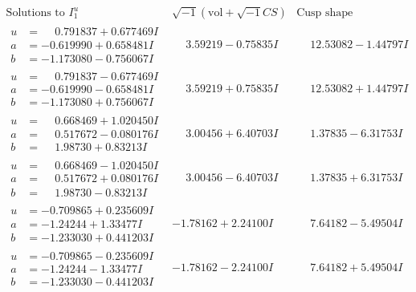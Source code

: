 \documentclass[1p]{elsarticle_modified}
\theoremstyle{definition}
\newcommand{\I}{\sqrt{-1}}
\begin{document}
$$\begin{array}{c|c|c}  
\text{Solutions to }I^u_{1}& \I (\text{vol} + \sqrt{-1}CS) & \text{Cusp shape}\\
 \hline 
\begin{aligned}
u &= \phantom{-}0.791837 + 0.677469 I \\
a &= -0.619990 + 0.658481 I \\
b &= -1.173080 - 0.756067 I\end{aligned}
 & \phantom{-}3.59219 - 0.75835 I & \phantom{-}12.53082 - 1.44797 I \\ \hline\begin{aligned}
u &= \phantom{-}0.791837 - 0.677469 I \\
a &= -0.619990 - 0.658481 I \\
b &= -1.173080 + 0.756067 I\end{aligned}
 & \phantom{-}3.59219 + 0.75835 I & \phantom{-}12.53082 + 1.44797 I \\ \hline\begin{aligned}
u &= \phantom{-}0.668469 + 1.020450 I \\
a &= \phantom{-}0.517672 - 0.080176 I \\
b &= \phantom{-}1.98730 + 0.83213 I\end{aligned}
 & \phantom{-}3.00456 + 6.40703 I & \phantom{-}1.37835 - 6.31753 I \\ \hline\begin{aligned}
u &= \phantom{-}0.668469 - 1.020450 I \\
a &= \phantom{-}0.517672 + 0.080176 I \\
b &= \phantom{-}1.98730 - 0.83213 I\end{aligned}
 & \phantom{-}3.00456 - 6.40703 I & \phantom{-}1.37835 + 6.31753 I \\ \hline\begin{aligned}
u &= -0.709865 + 0.235609 I \\
a &= -1.24244 + 1.33477 I \\
b &= -1.233030 + 0.441203 I\end{aligned}
 & -1.78162 + 2.24100 I & \phantom{-}7.64182 - 5.49504 I \\ \hline\begin{aligned}
u &= -0.709865 - 0.235609 I \\
a &= -1.24244 - 1.33477 I \\
b &= -1.233030 - 0.441203 I\end{aligned}
 & -1.78162 - 2.24100 I & \phantom{-}7.64182 + 5.49504 I \\ \hline\begin{aligned}

\end{aligned}
\end{array}$$
\end{document}
